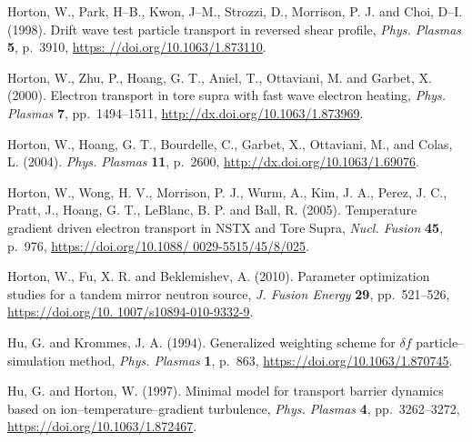 \documentclass[a4paper,openany,12pt]{book}
\begin{document}
\begin{thebibliography}{100}
\bibitem{}
Horton, W., Park, H--B., Kwon, J--M., Strozzi, D., Morrison, P. J. and Choi, D--I. (1998). Drift wave test particle transport in reversed shear profile, \emph{Phys. Plasmas} \textbf{5}, p.~3910, \url{https: //doi.org/10.1063/1.873110}.

\bibitem{}
Horton, W., Zhu, P., Hoang, G. T., Aniel, T., Ottaviani, M. and Garbet, X. (2000). Electron transport in tore supra with fast wave electron heating, \emph{Phys. Plasmas} \textbf{7}, pp.~1494--1511, \url{http://dx.doi.org/10.1063/1.873969}.

\bibitem{}
Horton, W., Hoang, G. T., Bourdelle, C., Garbet, X., Ottaviani, M., and Colas, L. (2004). \emph{Phys. Plasmas} 
\textbf{11}, p.~2600, \url{http://dx.doi.org/10.1063/1.69076}.

\bibitem{}
Horton, W., Wong, H. V., Morrison, P. J., Wurm, A., Kim, J. A., Perez, J. C., Pratt, J., Hoang, G. T., LeBlanc, B. P. and Ball, R. (2005). Temperature gradient driven electron transport in NSTX and Tore Supra, \emph{Nucl. Fusion} 
\textbf{45}, p.~976, \url{https://doi.org/10.1088/ 0029-5515/45/8/025}.

\bibitem{}
Horton, W., Fu, X. R. and Beklemishev, A. (2010). Parameter optimization studies for a tandem mirror neutron source, \emph{J. Fusion Energy} \textbf{29}, pp.~521--526, \url{https://doi.org/10. 1007/s10894-010-9332-9}.

\bibitem{}
Hu, G. and Krommes, J. A. (1994). Generalized weighting scheme for $\delta f$ particle--simulation method, 
\emph{Phys. Plasmas} \textbf{1}, p.~863, \url{https://doi.org/10.1063/1.870745}.

\bibitem{}
Hu, G. and  Horton, W. (1997). Minimal model for transport barrier dynamics based on ion--temperature--gradient turbulence, {\em Phys. Plasmas} \textbf{4}, pp.~3262--3272, \url{https://doi.org/10.1063/1.872467}.


\end{thebibliography}
\end{document}
